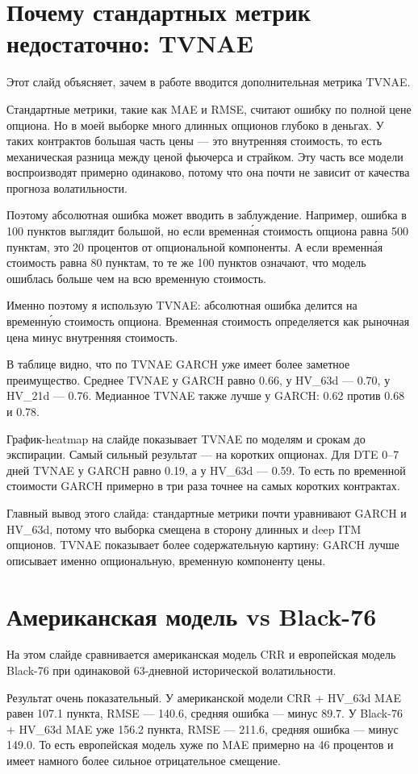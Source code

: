 \documentclass[11pt,a4paper]{article}
\newcommand{\slidetitle}[1]{\section{#1}}
\begin{document}
\slidetitle{Почему стандартных метрик недостаточно: TVNAE}

Этот слайд объясняет, зачем в работе вводится дополнительная метрика TVNAE.

Стандартные метрики, такие как MAE и RMSE, считают ошибку по полной цене опциона. Но в моей выборке много длинных опционов глубоко в деньгах. У таких контрактов большая часть цены --- это внутренняя стоимость, то есть механическая разница между ценой фьючерса и страйком. Эту часть все модели воспроизводят примерно одинаково, потому что она почти не зависит от качества прогноза волатильности.

Поэтому абсолютная ошибка может вводить в заблуждение. Например, ошибка в 100 пунктов выглядит большой, но если временна́я стоимость опциона равна 500 пунктам, это 20 процентов от опциональной компоненты. А если временна́я стоимость равна 80 пунктам, то те же 100 пунктов означают, что модель ошиблась больше чем на всю временную стоимость.

Именно поэтому я использую TVNAE: абсолютная ошибка делится на временну́ю стоимость опциона. Временная стоимость определяется как рыночная цена минус внутренняя стоимость.

В таблице видно, что по TVNAE GARCH уже имеет более заметное преимущество. Среднее TVNAE у GARCH равно 0.66, у HV\_63d --- 0.70, у HV\_21d --- 0.76. Медианное TVNAE также лучше у GARCH: 0.62 против 0.68 и 0.78.

График-heatmap на слайде показывает TVNAE по моделям и срокам до экспирации. Самый сильный результат --- на коротких опционах. Для DTE 0--7 дней TVNAE у GARCH равно 0.19, а у HV\_63d --- 0.59. То есть по временной стоимости GARCH примерно в три раза точнее на самых коротких контрактах.

Главный вывод этого слайда: стандартные метрики почти уравнивают GARCH и HV\_63d, потому что выборка смещена в сторону длинных и deep ITM опционов. TVNAE показывает более содержательную картину: GARCH лучше описывает именно опциональную, временную компоненту цены.

\slidetitle{Американская модель vs Black-76}

На этом слайде сравнивается американская модель CRR и европейская модель Black-76 при одинаковой 63-дневной исторической волатильности.

Результат очень показательный. У американской модели CRR + HV\_63d MAE равен 107.1 пункта, RMSE --- 140.6, средняя ошибка --- минус 89.7. У Black-76 + HV\_63d MAE уже 156.2 пункта, RMSE --- 211.6, средняя ошибка --- минус 149.0. То есть европейская модель хуже по MAE примерно на 46 процентов и имеет намного более сильное отрицательное смещение.
\end{document}
